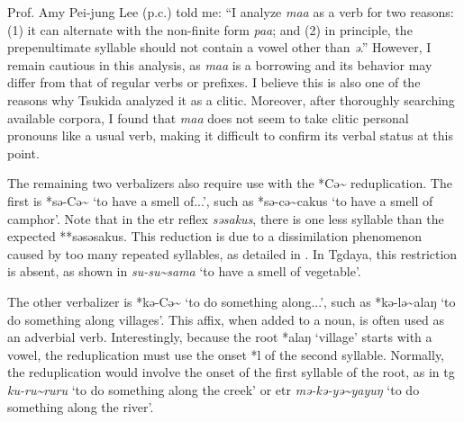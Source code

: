 Prof. Amy Pei-jung Lee (p.c.) told me: ``I analyze \textit{maa} as a verb for two reasons: (1) it can alternate with the non-finite form \textit{paa}; and (2) in principle, the prepenultimate syllable should not contain a vowel other than \textit{ə}.'' However, I remain cautious in this analysis, as \textit{maa} is a borrowing and its behavior may differ from that of regular verbs or prefixes. I believe this is also one of the reasons why Tsukida analyzed it as a clitic. Moreover, after thoroughly searching available corpora, I found that \textit{maa} does not seem to take clitic personal pronouns like a usual verb, making it difficult to confirm its verbal status at this point.


The remaining two verbalizers also require use with the *Cə\~{} reduplication. The first is *sə-Cə\~{} `to have a smell of...', such as *sə-cə\~{}cakus `to have a smell of camphor'. Note that in the \acl{etr} reflex \textit{səsakus}, there is one less syllable than the expected **səsəsakus. This reduction is due to a dissimilation phenomenon caused by too many repeated syllables, as detailed in \textcite[4]{lee2009odor}. In Tgdaya, this restriction is absent, as shown in \textit{su-su\~{}sama} `to have a smell of vegetable'.


The other verbalizer is *kə-Cə\~{} `to do something along...', such as *kə-lə\~{}alaŋ `to do something along villages'. This affix, when added to a noun, is often used as an adverbial verb. Interestingly, because the root *alaŋ `village' starts with a vowel, the reduplication must use the onset *l of the second syllable. Normally, the reduplication would involve the onset of the first syllable of the root, as in \acl{tg} \textit{ku-ru\~{}ruru} `to do something along the creek' or \acl{etr} \textit{mə-kə-yə\~{}yayuŋ} `to do something along the river'.

